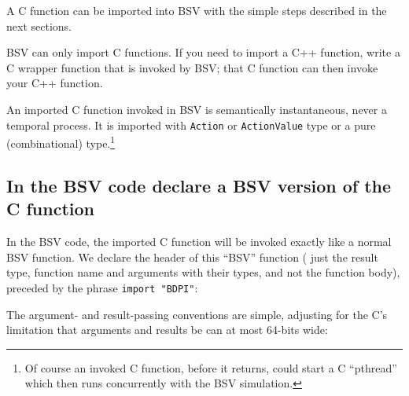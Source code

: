 A C function can be imported into BSV with the simple steps described
in the next sections.

BSV can only import C functions.  If you need to import a C++
function, write a C wrapper function that is invoked by BSV; that C
function can then invoke your C++ function.

An imported C function invoked in BSV is semantically instantaneous,
never a temporal process.  It is imported with \verb|Action| or
\verb|ActionValue| type or a pure (combinational) type.\footnote{Of
course an invoked C function, before it returns, could start a C
``pthread'' which then runs concurrently with the BSV simulation.}


\subsection{In the BSV code declare a BSV version of the C function}


In the BSV code, the imported C function will be invoked exactly like
a normal BSV function.  We declare the header of this ``BSV'' function
({\ie} just the result type, function name and arguments with their
types, and not the function body), preceded by the phrase {\tt import
"BDPI"}:

\begin{center}
\end{center}

The argument- and result-passing conventions are simple, adjusting for
the C's limitation that arguments and results be can at most 64-bits
wide:

